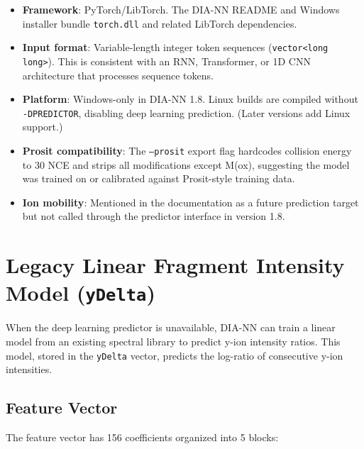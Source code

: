 \documentclass[11pt,a4paper]{article}
\begin{document}
\begin{itemize}
    \item \textbf{Framework}: PyTorch/LibTorch. The DIA-NN README and Windows installer bundle \texttt{torch.dll} and related LibTorch dependencies.
    \item \textbf{Input format}: Variable-length integer token sequences (\texttt{vector<long long>}). This is consistent with an RNN, Transformer, or 1D CNN architecture that processes sequence tokens.
    \item \textbf{Platform}: Windows-only in DIA-NN 1.8. Linux builds are compiled without \texttt{-DPREDICTOR}, disabling deep learning prediction. (Later versions add Linux support.)
    \item \textbf{Prosit compatibility}: The \texttt{--prosit} export flag hardcodes collision energy to 30 NCE and strips all modifications except M(ox), suggesting the model was trained on or calibrated against Prosit-style training data.
    \item \textbf{Ion mobility}: Mentioned in the documentation as a future prediction target but not called through the predictor interface in version 1.8.
\end{itemize}

\section{Legacy Linear Fragment Intensity Model (\texttt{yDelta})}
\label{sec:ydelta}

When the deep learning predictor is unavailable, DIA-NN can train a linear model from an existing spectral library to predict y-ion intensity ratios. This model, stored in the \texttt{yDelta} vector, predicts the log-ratio of consecutive y-ion intensities.

\subsection{Feature Vector}

The feature vector has 156 coefficients organized into 5 blocks:
\end{document}
